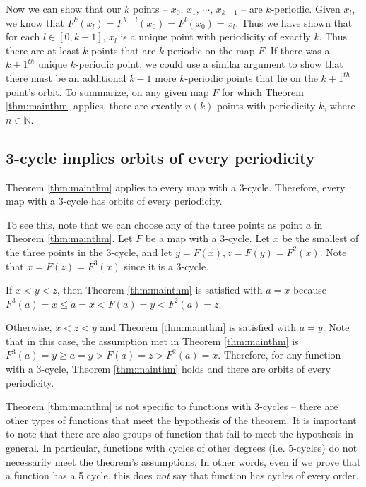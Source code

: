 \documentclass[12pt]{IEEEtran}
\begin{document}
Now we can show that our $k$ points -- $x_0$, $x_1$, $\cdots$, $x_{k-1}$ -- are $k$-periodic. Given $x_l$, we know that $F^k \left( x_l \right) = F^{k+l} \left ( x_0 \right) = F^{l} \left ( x_0 \right) = x_l$. Thus we have shown that for each $l \in [0,k-1]$, $x_l$ is a unique point with periodicity of exactly $k$. Thus there are at least $k$ points that are $k$-periodic on the map $F$. If there was a $k+1^{th}$ unique $k$-periodic point, we could use a similar argument to show that there must be an additional $k-1$ more $k$-periodic points that lie on the $k+1^{th}$ point's orbit. To summarize, on any given map $F$ for which Theorem \ref{thm:mainthm} applies, there are excatly $n \left( k \right)$ points with periodicity $k$, where $n \in \mathbb{N}$.



\subsection{ 3-cycle implies orbits of every periodicity}
Theorem \ref{thm:mainthm} applies to every map with a 3-cycle. Therefore, every map with a 3-cycle has orbits of every periodicity.

To see this, note that we can choose any of the three points as point $a$ in Theorem \ref{thm:mainthm}. Let $F$ be a map with a 3-cycle. Let $x$ be the smallest of the three points in the 3-cycle, and let $y = F \left( x \right), z = F \left( y \right) = F^2 \left( x \right)$. Note that $x = F \left( z \right) = F^3 \left( x \right)$ since it is a 3-cycle.

If $ x < y < z$, then Theorem \ref{thm:mainthm} is satisfied with $a=x$ because $F^3\left(a\right)=x \leq a=x < F\left(a\right)=y < F^2\left(a\right)=z$.

Otherwise, $x < z < y$ and Theorem \ref{thm:mainthm} is satisfied with $a=y$. Note that in this case, the assumption met in Theorem \ref{thm:mainthm} is $F^3\left(a\right)=y \geq a=y > F\left(a\right)=z > F^2\left(a\right)=x$. Therefore, for any function with a 3-cycle, Theorem \ref{thm:mainthm} holds and there are orbits of every periodicity.

Theorem \ref{thm:mainthm} is not specific to functions with 3-cycles -- there are other types of functions that meet the hypothesis of the theorem. It is important to note that there are also groups of function that fail to meet the hypothesis in general. In particular, functions with cycles of other degrees (i.e. 5-cycles) do not necessarily meet the theorem's assumptions. In other words, even if we prove that a function has a 5 cycle, this does {\it not} say that function has cycles of every order.
\end{document}
